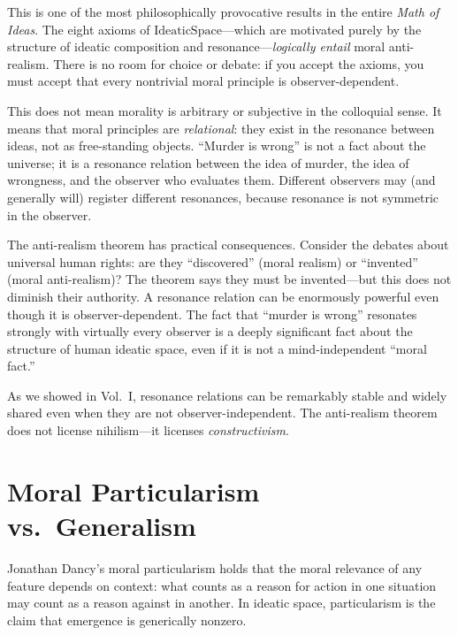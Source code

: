 \begin{interpretation}
This is one of the most philosophically provocative results in the entire
\emph{Math of Ideas}. The eight axioms of $\mathrm{IdeaticSpace}$---which
are motivated purely by the structure of ideatic composition and
resonance---\emph{logically entail} moral anti-realism. There is no room for
choice or debate: if you accept the axioms, you must accept that every
nontrivial moral principle is observer-dependent.

This does not mean morality is arbitrary or subjective in the colloquial sense.
It means that moral principles are \emph{relational}: they exist in the
resonance between ideas, not as free-standing objects. ``Murder is wrong''
is not a fact about the universe; it is a resonance relation between the
idea of murder, the idea of wrongness, and the observer who evaluates
them. Different observers may (and generally will) register different
resonances, because resonance is not symmetric in the observer.

The anti-realism theorem has practical consequences. Consider the debates
about universal human rights: are they ``discovered'' (moral realism) or
``invented'' (moral anti-realism)? The theorem says they must be
invented---but this does not diminish their authority. A resonance relation
can be enormously powerful even though it is observer-dependent. The fact
that ``murder is wrong'' resonates strongly with virtually every observer
is a deeply significant fact about the structure of human ideatic space,
even if it is not a mind-independent ``moral fact.''

As we showed in Vol.~I, resonance relations can be remarkably stable and
widely shared even when they are not observer-independent. The anti-realism
theorem does not license nihilism---it licenses \emph{constructivism}.
\end{interpretation}

\section{Moral Particularism vs.\ Generalism}
\label{sec:particularism}

Jonathan Dancy's moral particularism holds that the moral relevance of any
feature depends on context: what counts as a reason for action in one
situation may count as a reason against in another. In ideatic space,
particularism is the claim that emergence is generically nonzero.


